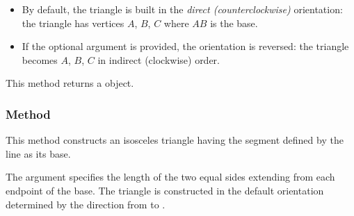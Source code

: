 \begin{itemize}
  \item By default, the triangle is built in the \emph{direct (counterclockwise)} orientation: the triangle has vertices $A$, $B$, $C$ where $AB$ is the base.
  \item If the optional argument  is provided, the orientation is reversed: the triangle becomes $A$, $B$, $C$ in indirect (clockwise) order.
\end{itemize}

\medskip

This method returns a  object.


\vspace{1em}
\begin{minipage}{.5\textwidth}
  \begin{center}
  \end{center}
\end{minipage}
\begin{minipage}{.5\textwidth}
\begin{tkzexample}
\end{tkzexample}
\end{minipage}

\subsubsection{Method }
\label{ssub:method_line_isosceles}

This method constructs an isosceles triangle having the segment defined by the line as its base.

\medskip
The argument  specifies the length of the two equal sides extending from each endpoint of the base. The triangle is constructed in the default orientation determined by the direction from  to .

\medskip

